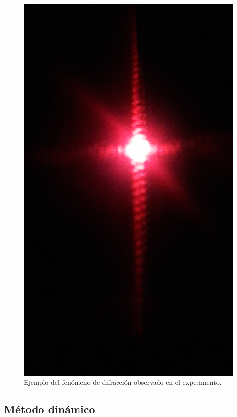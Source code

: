 \documentclass[twoside,twocolumn,a4paper]{article}
\begin{document}
\begin{figure}[H]
\includegraphics[width=\linewidth]{difrac.jpg}
\caption{Ejemplo del fen\'omeno de difracci\'on observado en el experimento.}
\label{fig:difrac}
\end{figure}

\subsection{M\'etodo din\'amico}
\end{document}

